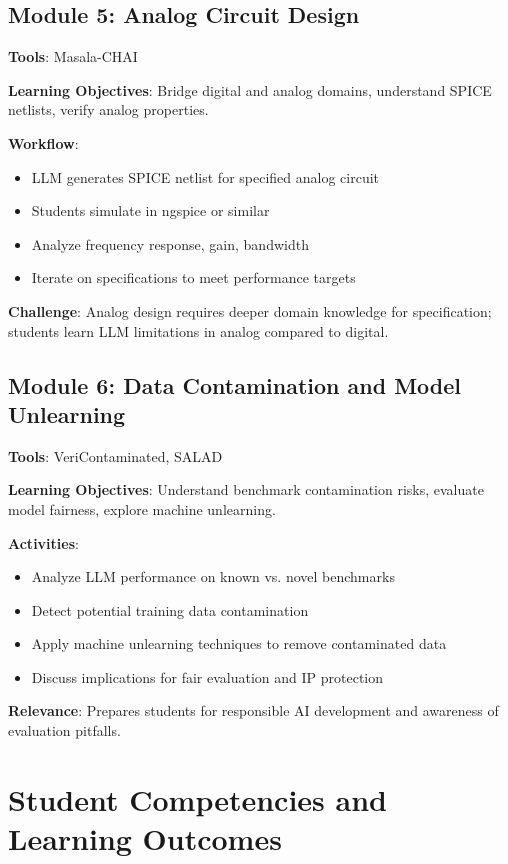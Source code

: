 \documentclass[10pt,conference]{IEEEtran}
\begin{document}
\subsection{Module 5: Analog Circuit Design}

\textbf{Tools}: Masala-CHAI

\textbf{Learning Objectives}: Bridge digital and analog domains, understand SPICE netlists, verify analog properties.

\textbf{Workflow}:
\begin{itemize}
    \item LLM generates SPICE netlist for specified analog circuit
    \item Students simulate in ngspice or similar
    \item Analyze frequency response, gain, bandwidth
    \item Iterate on specifications to meet performance targets
\end{itemize}

\textbf{Challenge}: Analog design requires deeper domain knowledge for specification; students learn LLM limitations in analog compared to digital.

\subsection{Module 6: Data Contamination and Model Unlearning}

\textbf{Tools}: VeriContaminated, SALAD

\textbf{Learning Objectives}: Understand benchmark contamination risks, evaluate model fairness, explore machine unlearning.

\textbf{Activities}:
\begin{itemize}
    \item Analyze LLM performance on known vs. novel benchmarks
    \item Detect potential training data contamination
    \item Apply machine unlearning techniques to remove contaminated data
    \item Discuss implications for fair evaluation and IP protection
\end{itemize}

\textbf{Relevance}: Prepares students for responsible AI development and awareness of evaluation pitfalls.

\section{Student Competencies and Learning Outcomes}
\label{sec:competencies}
\end{document}
